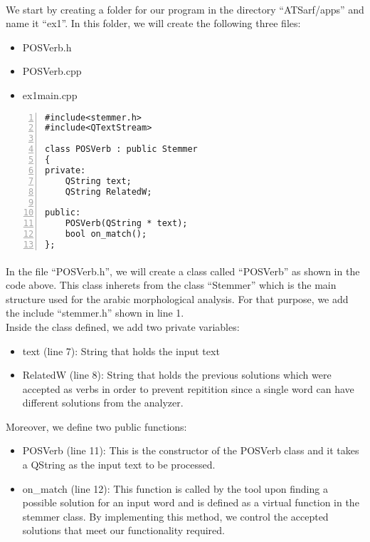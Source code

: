 \documentclass{article}
\begin{document}
\paragraph{}
We start by creating a folder for our program in the directory ``ATSarf/apps'' and name it ``ex1''. In this folder, we will create the following three files:
\begin{itemize}
\item POSVerb.h
\item POSVerb.cpp
\item ex1main.cpp
\end{itemize}

\begin{Verbatim}[numbers=left]
#include<stemmer.h>
#include<QTextStream>

class POSVerb : public Stemmer
{
private:
    QString text;
    QString RelatedW;

public:
    POSVerb(QString * text);
    bool on_match();
};
\end{Verbatim}

\paragraph{}
In the file ``POSVerb.h'', we will create a class called ``POSVerb'' as shown in the code above. This class inherets from the class ``Stemmer'' which is the main structure used for the arabic morphological analysis. For that purpose, we add the include ``stemmer.h'' shown in line 1.\\

Inside the class defined, we add two private variables:
\begin{itemize}
\item text (line 7): String that holds the input text
\item RelatedW (line 8): String that holds the previous solutions which were accepted as verbs in order to prevent repitition since a single word can have different solutions from the analyzer.
\end{itemize}

Moreover, we define two public functions:
\begin{itemize}
\item POSVerb (line 11): This is the constructor of the POSVerb class and it takes a QString as the input text to be processed.
\item on\_match (line 12): This function is called by the tool upon finding a possible solution for an input word and is defined as a virtual function in the stemmer class. By implementing this method, we control the accepted solutions that meet our functionality required.
\end{itemize}
\end{document}
